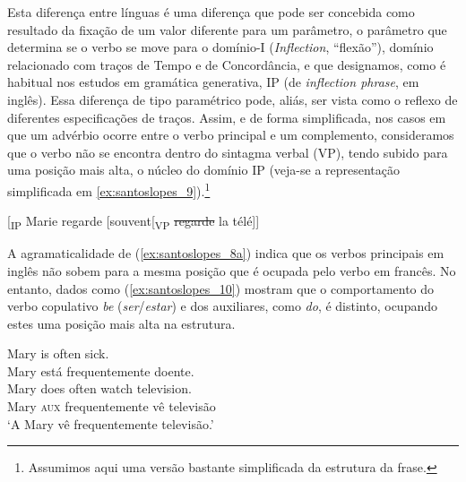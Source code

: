 \documentclass[output=paper]{LSP/langsci}
\begin{document}
\ea\label{ex:santoslopes_7}
\zl

\ea\label{ex:santoslopes_8}
\zl

Esta diferença entre línguas é uma diferença que pode ser concebida como resultado da fixação de um valor diferente para um parâmetro, o parâmetro que determina se o verbo se move para o domínio-I (\textit{Inflection}, “flexão”), domínio relacionado com traços de Tempo e de Concordância, e que designamos, como é habitual nos estudos em gramática generativa, IP (de \textit{inflection phrase}, em inglês). Essa diferença de tipo paramétrico pode, aliás, ser vista como o reflexo de diferentes especificações de traços. Assim, e de forma simplificada, nos casos em que um advérbio ocorre entre o verbo principal e um complemento, consideramos que o verbo não se encontra dentro do sintagma verbal (VP), tendo subido para uma posição mais alta, o núcleo do domínio IP (veja-se a representação simplificada em \ref{ex:santoslopes_9}).\footnote{Assumimos aqui uma versão bastante simplificada da estrutura da frase.}

\ea\label{ex:santoslopes_9}
[\textsubscript{IP} Marie regarde [souvent[\textsubscript{VP} \sout{regarde} la télé]] 
\z

A agramaticalidade de (\ref{ex:santoslopes_8a}) indica que os verbos principais em inglês não sobem para a mesma posição que é ocupada pelo verbo em francês. No entanto, dados como (\ref{ex:santoslopes_10}) mostram que o comportamento do verbo copulativo \textit{be} (\textit{ser}/\textit{estar}) e dos auxiliares, como \textit{do}, é distinto, ocupando estes uma posição mais alta na estrutura.

\ea\label{ex:santoslopes_10}
\ea\label{ex:santoslopes_10a}
\gll Mary is often sick.\\
Mary está frequentemente doente.\\
\ex\label{ex:santoslopes_10b}
\gll Mary does often watch television.\\
Mary \textsc{aux} frequentemente vê televisão\\
\glt `A Mary vê frequentemente televisão.'\\
\zl
\end{document}
